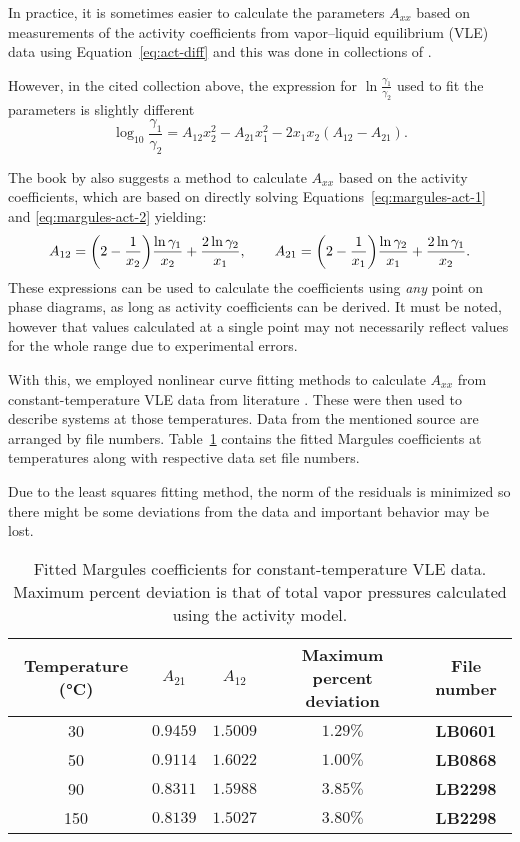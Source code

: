 In practice, it is sometimes easier to calculate the parameters $A_{xx}$ based on
measurements of the activity coefficients from vapor--liquid equilibrium (VLE) data 
using Equation~\ref{eq:act-diff} and this was done in collections of 
.

However, in the cited collection above, the expression for 
$\ln\frac{\gamma_1}{\gamma_2}$ used to fit the parameters is slightly different
\[
    \log_{10} \dfrac{\gamma_1}{\gamma_2} =  A_{12}x_2^2 - A_{21}x_1^2 - 2x_1x_2
    (A_{12} - A_{21}).
\]

The book by  also suggests a method to calculate $A_{xx}$
based on the activity coefficients, which are based on directly solving
Equations~\ref{eq:margules-act-1} and \ref{eq:margules-act-2} yielding:
\[
    A_{12} = \qty(2 - \frac1{x_2}) \dfrac{\ln\gamma_1}{x_2} + 
    \dfrac{2\ln\gamma_2}{x_1},\qquad
    A_{21} = \qty(2 - \frac1{x_1}) \dfrac{\ln\gamma_2}{x_1} + 
    \dfrac{2\ln\gamma_1}{x_2}.
\]
These expressions can be used to calculate the coefficients using \textit{any} point
on phase diagrams, as long as activity coefficients can be derived. It must be noted,
however that values calculated at a single point may not necessarily 
reflect values for the whole range due to experimental errors.

With this, we employed nonlinear curve fitting methods to calculate $A_{xx}$ from 
constant-temperature VLE data from literature \cite{wichtdat}. 
These were then used to describe systems at those temperatures.
Data from the mentioned source are arranged by file numbers. Table~\ref{tab:fits}
contains the fitted Margules coefficients at temperatures along with respective 
data set file numbers.

Due to the least squares fitting method, the norm of the residuals is
minimized so there might be some deviations from the data and important behavior
may be lost.

\begin{table}[ht]
    \centering
    \caption{Fitted Margules coefficients for constant-temperature VLE data.
    Maximum percent deviation is that of total vapor pressures calculated using
    the activity model.}
    \medskip
    \begin{tabular}{c|cc|c|c}
        Temperature (\si{\celsius}) & $A_{21}$ & $A_{12}$ & Maximum 
        percent deviation & File number \\ \hline
        \num{30} & $0.9459$ & $1.5009$ & $1.29\%$ & \textbf{LB0601} \\
        \num{50} & $0.9114$ & $1.6022$ & $1.00\%$ & \textbf{LB0868} \\
        \num{90} & $0.8311$ & $1.5988$ & $3.85\%$ & \textbf{LB2298} \\
        \num{150} & $0.8139$ & $1.5027$ & $3.80\%$ & \textbf{LB2298}
    \end{tabular}
    \label{tab:fits}
\end{table}
